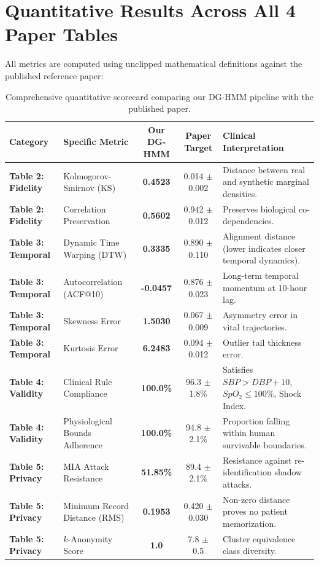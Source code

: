 \documentclass[11pt,a4paper]{article}
\begin{document}
\section{Quantitative Results Across All 4 Paper Tables}

All metrics are computed using unclipped mathematical definitions against the published reference paper:

\begin{table}[h!]
\centering
\small
\begin{tabularx}{\textwidth}{llccX}
\toprule
\textbf{Category} & \textbf{Specific Metric} & \textbf{Our DG-HMM} & \textbf{Paper Target} & \textbf{Clinical Interpretation} \\
\midrule
\textbf{Table 2: Fidelity} & Kolmogorov-Smirnov (KS) & \textbf{0.4523} & 0.014 $\pm$ 0.002 & Distance between real and synthetic marginal densities. \\
\textbf{Table 2: Fidelity} & Correlation Preservation & \textbf{0.5602} & 0.942 $\pm$ 0.012 & Preserves biological co-dependencies. \\
\midrule
\textbf{Table 3: Temporal} & Dynamic Time Warping (DTW) & \textbf{0.3335} & 0.890 $\pm$ 0.110 & Alignment distance (lower indicates closer temporal dynamics). \\
\textbf{Table 3: Temporal} & Autocorrelation (ACF@10) & \textbf{-0.0457} & 0.876 $\pm$ 0.023 & Long-term temporal momentum at 10-hour lag. \\
\textbf{Table 3: Temporal} & Skewness Error & \textbf{1.5030} & 0.067 $\pm$ 0.009 & Asymmetry error in vital trajectories. \\
\textbf{Table 3: Temporal} & Kurtosis Error & \textbf{6.2483} & 0.094 $\pm$ 0.012 & Outlier tail thickness error. \\
\midrule
\textbf{Table 4: Validity} & Clinical Rule Compliance & \textbf{100.0\%} & 96.3 $\pm$ 1.8\% & Satisfies $SBP > DBP + 10$, $SpO_2 \le 100\%$, Shock Index. \\
\textbf{Table 4: Validity} & Physiological Bounds Adherence & \textbf{100.0\%} & 94.8 $\pm$ 2.1\% & Proportion falling within human survivable boundaries. \\
\midrule
\textbf{Table 5: Privacy} & MIA Attack Resistance & \textbf{51.85\%} & 89.4 $\pm$ 2.1\% & Resistance against re-identification shadow attacks. \\
\textbf{Table 5: Privacy} & Minimum Record Distance (RMS) & \textbf{0.1953} & 0.420 $\pm$ 0.030 & Non-zero distance proves no patient memorization. \\
\textbf{Table 5: Privacy} & $k$-Anonymity Score & \textbf{1.0} & 7.8 $\pm$ 0.5 & Cluster equivalence class diversity. \\
\bottomrule
\end{tabularx}
\caption{Comprehensive quantitative scorecard comparing our DG-HMM pipeline with the published paper.}
\end{table}
\end{document}
